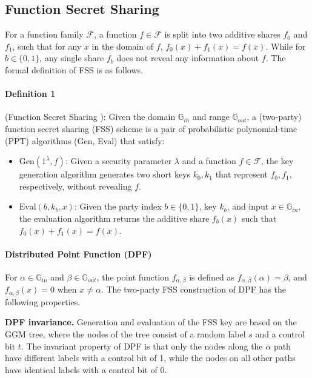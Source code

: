 \documentclass[journal]{IEEEtran}
\theoremstyle{definition}
\theoremstyle{plain}
\begin{document}
\subsection{Function Secret Sharing}\label{sec:fss}
For a function family $\mathcal{F}$, a function $f \in \mathcal{F}$ is split into two additive shares $f_0$ and $f_1$, such that for any $x$ in the domain of $f$, $f_0(x) + f_1(x) = f(x)$. While for $b \in \{0,1\}$, any single share $f_b$ does not reveal any information about $f$. The formal definition of FSS is as follows.

\paragraph{Definition 1} (Function Secret Sharing \cite{bgi15, bgi16}): Given the domain $\mathbb{G}_{in}$ and range $\mathbb{G}_{out}$, a (two-party) function secret sharing (FSS) scheme is a pair of probabilistic polynomial-time (PPT) algorithms (Gen, Eval) that satisfy:
\begin{itemize}
    \item $\text{Gen}(1^{\lambda},f)$: Given a security parameter $\lambda$ and a function $f \in \mathcal{F}$, the key generation algorithm generates two short keys $k_0, k_1$ that represent $f_0, f_1$, respectively, without revealing $f$.
    \item $\text{Eval}(b, k_b, x)$: Given the party index $b \in \{0, 1\}$, key $k_b$, and input $x \in \mathbb{G}_{in}$, the evaluation algorithm returns the additive share $f_b(x)$ such that $f_0(x) + f_1(x) = f(x)$.
\end{itemize}

\paragraph{Distributed Point Function (DPF) \cite{bgi16}} For $\alpha \in \mathbb{G}_{in}$ and $\beta \in \mathbb{G}_{out}$, the point function $f_{\alpha,\beta}$ is defined as $f_{\alpha,\beta}(\alpha) = \beta$, and $f_{\alpha,\beta}(x) = 0$ when $x \neq \alpha$. The two-party FSS construction of DPF has the following properties.

\textbf{DPF invariance.} Generation and evaluation of the FSS key are based on the GGM tree, where the nodes of the tree consist of a random label $s$ and a control bit $t$. The invariant property of DPF is that only the nodes along the $\alpha$ path have different labels with a control bit of 1, while the nodes on all other paths have identical labels with a control bit of 0.
\end{document}
